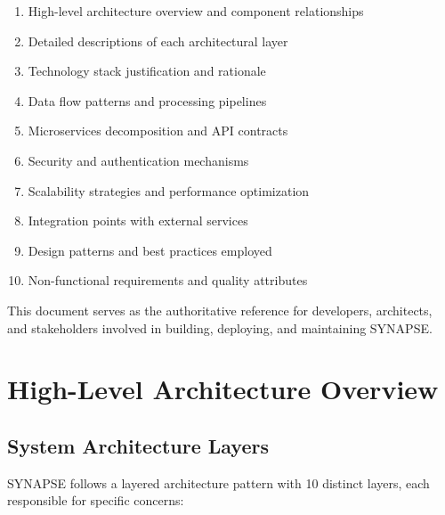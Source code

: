 \documentclass[12pt,a4paper]{report}
\begin{document}
\begin{enumerate}
    \item High-level architecture overview and component relationships
    \item Detailed descriptions of each architectural layer
    \item Technology stack justification and rationale
    \item Data flow patterns and processing pipelines
    \item Microservices decomposition and API contracts
    \item Security and authentication mechanisms
    \item Scalability strategies and performance optimization
    \item Integration points with external services
    \item Design patterns and best practices employed
    \item Non-functional requirements and quality attributes
\end{enumerate}

\noindent
This document serves as the authoritative reference for developers, architects, and stakeholders involved in building, deploying, and maintaining SYNAPSE.

\newpage

\chapter{High-Level Architecture Overview}

\section{System Architecture Layers}

SYNAPSE follows a layered architecture pattern with 10 distinct layers, each responsible for specific concerns:
\end{document}
